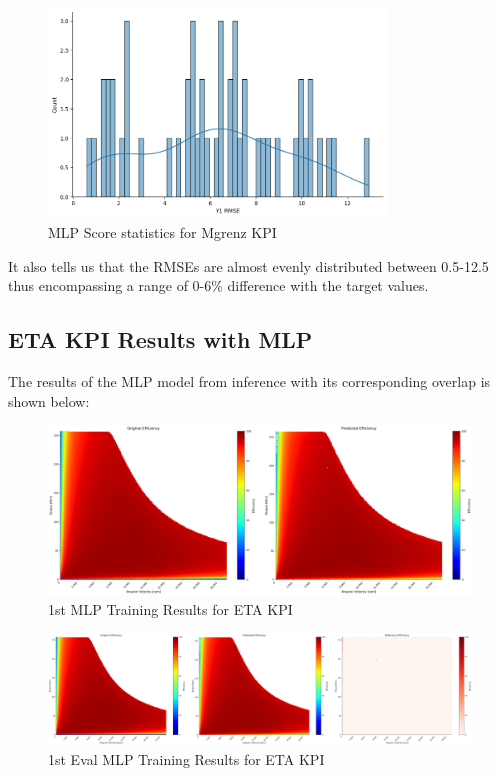 \documentclass{report} %
\begin{document}
\begin{figure}[H]
    \centering
    \includegraphics[width=0.8\textwidth]{./ReportImages/score_MLP_y1.png } 
    \caption{MLP Score statistics for Mgrenz \ac{KPI}} 
    \label{fig:MLP Score statistics for 2D KPI(Mgrenz)}
\end{figure}
It also tells us that the \ac{RMSE}s are almost evenly distributed between 0.5-12.5 thus encompassing a range of 0-6\% difference with the target values.\\

\subsection{ETA \ac{KPI} Results with \ac{MLP}}\label{sec:3D ETA Grid Results with MLP}

The results of the \ac{MLP} model from inference with its corresponding overlap is shown below: \\

\begin{figure}[H]
    \centering
    \includegraphics[width=1\textwidth]{./ReportImages/KPI3Dprediction1.png} 
    \caption{1st MLP Training Results for ETA \ac{KPI}} 
    \label{fig:1st MLP Training Results for 3D KPI(ETA)}
\end{figure}

\begin{figure}[H]
    \centering
    \includegraphics[width=1\textwidth]{./ReportImages/evalKPI3Dprediction1.png} 
    \caption{1st Eval MLP Training Results for ETA \ac{KPI}} 
    \label{fig:1st Eval MLP Training Results for 3D KPI(ETA)}
\end{figure}
\end{document}
